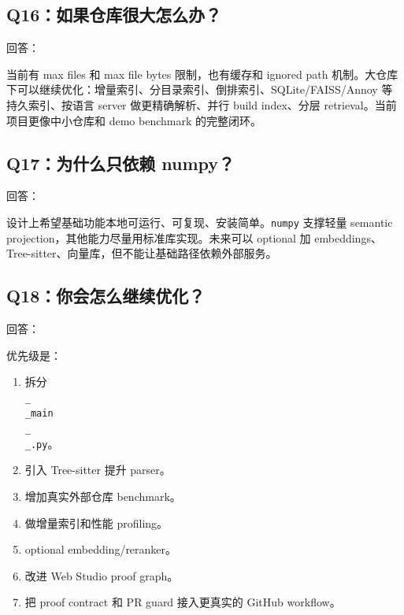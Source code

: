 \documentclass[UTF8,12pt,openany]{ctexbook}
\begin{document}
\subsection{Q16：如果仓库很大怎么办？}

回答：\par

当前有 max files 和 max file bytes 限制，也有缓存和 ignored path 机制。大仓库下可以继续优化：增量索引、分目录索引、倒排索引、SQLite/FAISS/Annoy 等持久索引、按语言 server 做更精确解析、并行 build index、分层 retrieval。当前项目更像中小仓库和 demo benchmark 的完整闭环。\par

\subsection{Q17：为什么只依赖 numpy？}

回答：\par

设计上希望基础功能本地可运行、可复现、安装简单。\texttt{numpy} 支撑轻量 semantic projection，其他能力尽量用标准库实现。未来可以 optional 加 embeddings、Tree-sitter、向量库，但不能让基础路径依赖外部服务。\par

\subsection{Q18：你会怎么继续优化？}

回答：\par

优先级是：\par

\begin{enumerate}
\item 拆分 \texttt{\\_\\_main\\_\\_.py}。
\item 引入 Tree-sitter 提升 parser。
\item 增加真实外部仓库 benchmark。
\item 做增量索引和性能 profiling。
\item optional embedding/reranker。
\item 改进 Web Studio proof graph。
\item 把 proof contract 和 PR guard 接入更真实的 GitHub workflow。
\end{enumerate}
\end{document}
